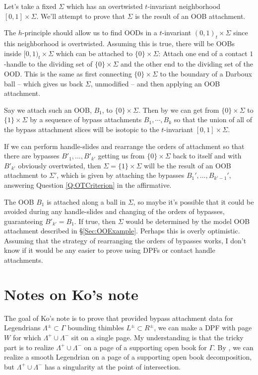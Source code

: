 \documentclass[11pt]{amsart}
\newcommand{\Lag}{L}
\newcommand{\posNegLag}{\Lag^{\pm}}
\newcommand{\Leg}{\Lambda}
\newcommand{\posLeg}{\Leg^{+}}
\newcommand{\negLeg}{\Leg^{-}}
\newcommand{\posNegLeg}{\Leg^{\pm}}
\newcommand{\divSet}{\Gamma}
\begin{document}
Let's take a fixed $\Sigma$ which has an overtwisted $t$-invariant neighborhood $[0, 1] \times \Sigma$. We'll attempt to prove that $\Sigma$ is the result of an OOB attachment.

The $h$-principle should allow us to find OODs in a $t$-invariant $(0, 1)_{t} \times \Sigma$ since this neighborhood is overtwisted. Assuming this is true, there will be OOBs inside $[0 ,1)_{t} \times \Sigma$ which can be attached to $\{ 0 \} \times \Sigma$: Attach one end of a contact $1$-handle to the dividing set of $\{ 0 \} \times \Sigma$ and the other end to the dividing set of the OOD. This is the same as first connecting $\{0\} \times \Sigma$ to the boundary of a Darboux ball -- which gives us back $\Sigma$, unmodified -- and then applying an OOB attachment.

Say we attach such an OOB, $B_{1}$, to $\{ 0 \} \times \Sigma$. Then by \cite[Theorem 1.2.5]{HH:Convex} we can get from $\{ 0 \} \times \Sigma$ to $\{ 1 \} \times \Sigma$ by a sequence of bypass attachments $B_{1}, \cdots, B_{k}$ so that the union of all of the bypass attachment slices will be isotopic to the $t$-invariant $[0, 1]\times \Sigma$.

If we can perform handle-slides and rearrange the orders of attachment so that there are bypasses $B'_{1}, \dots, B'_{k'}$ getting us from $\{ 0 \} \times \Sigma$ back to itself and with $B'_{k'}$ obviously overtwisted, then $\Sigma = \{ 1 \} \times \Sigma$ will be the result of an OOB attachment to $\Sigma'$, which is given by attaching the bypasses $B_{1}', \dots, B_{k'-1}'$, answering Question \ref{Q:OTCriterion} in the affirmative.

The OOB $B_{1}$ is attached along a ball in $\Sigma$, so maybe it's possible that it could be avoided during any handle-slides and changing of the orders of bypasses, guaranteeing $B'_{k'} = B_{1}$. If true, then $\Sigma$ would be determined by the model OOB attachment described in \S \ref{Sec:OOExample}. Perhaps this is overly optimistic. Assuming that the strategy of rearranging the orders of bypasses works, I don't know if it would be any easier to prove using DPFs or contact handle attachments.

\section{Notes on Ko's note}\label{Sec:KoNote}

The goal of Ko's note is to prove that provided bypass attachment data for Legendrians $\posNegLeg \subset \divSet$ bounding thimbles $\posNegLag \subset R^{\pm}$, we can make a DPF with page $W$ for which $\posLeg \cup \negLeg$ sit on a single page. My understanding is that the tricky part is to realize $\posLeg \cup \negLeg$ on a page of a supporting open book for $\divSet$. By \cite[Corollary 1.3.3]{HH:Convex}, we can realize a smooth Legendrian on a page of a supporting open book decomposition, but $\posLeg \cup \negLeg$ has a singularity at the point of intersection.
\end{document}
